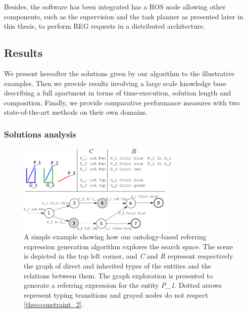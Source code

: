 \documentclass[a4paper,11pt,twoside]{StyleThese}
\begin{document}
Besides, the software has been integrated has a ROS node allowing other components, such as the supervision and the task planner as presented later in this thesis, to perform REG requests in a distributed architecture.


\subsection{Results}
We present hereafter the solutions given by our algorithm to the illustrative examples. Then we provide results involving a large scale knowledge base describing a full apartment in terms of time-execution, solution length and composition. Finally, we provide comparative performance measures with two state-of-the-art methods on their own domains.

\subsubsection{Solutions analysis}

\begin{figure}[hbtp]
\centering
\includegraphics[width=0.7\textwidth]{figures/chapter3/search.png}
\caption{A simple example showing how our ontology-based referring expression generation algorithm explores the search space. The scene is depicted in the top left corner, and \textit{C} and \textit{R} represent respectively the graph of direct and inherited types of the entities and the relations between them. The graph exploration is presented to generate a referring expression for the entity \textit{P\_1}. Dotted arrows represent typing transitions and grayed nodes do not respect \ref{theo:constraint_2}.}
\label{fig:search_example} 
\end{figure}
\end{document}
